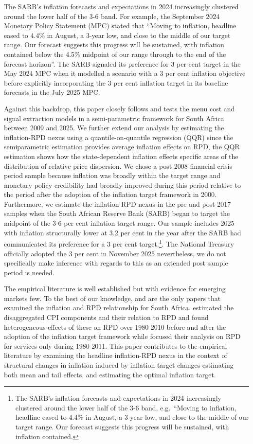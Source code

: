 \documentclass[
  letterpaper,
  DIV=11,
  numbers=noendperiod]{scrartcl}
\begin{document}
The SARB's inflation forecasts and expectations in 2024 increasingly
clustered around the lower half of the 3-6 band. For example, the
September 2024 Monetary Policy Statement (MPC) stated that ``Moving to
inflation, headline eased to 4.4\% in August, a 3-year low, and close to
the middle of our target range. Our forecast suggests this progress will
be sustained, with inflation contained below the 4.5\% midpoint of our
range through to the end of the forecast horizon''. The SARB signaled
its preference for 3 per cent target in the May 2024 MPC when it
modelled a scenario with a 3 per cent inflation objective before
explicitly incorporating the 3 per cent inflation target in its baseline
forecasts in the July 2025 MPC.

Against this backdrop, this paper closely follows \citet{caraballo2013}
and tests the menu cost and signal extraction models in a
semi-parametric framework \citep{robinson1988a} for South Africa between
2009 and 2025. We further extend our analysis by estimating the
inflation-RPD nexus using a quantile-on-quantile regression (QQR) since
the semiparametric estimation provides average inflation effects on RPD,
the QQR estimation shows how the state-dependent inflation effects
specific areas of the distribution of relative price dispersion. We
chose a post 2008 financial crisis period sample because inflation was
broadly within the target range and monetary policy credibility had
broadly improved during this period relative to the period after the
adoption of the inflation target framework in 2000. Furthermore, we
estimate the inflation-RPD nexus in the pre-and post-2017 samples when
the South African Reserve Bank (SARB) began to target the midpoint of
the 3-6 per cent inflation target range. Our sample includes 2025 with
inflation structurally lower at 3.2 per cent in the year after the SARB
had communicated its preference for a 3 per cent target.\footnote{The
  SARB's inflation forecasts and expectations in 2024 increasingly
  clustered around the lower half of the 3-6 band, e.g.~``Moving to
  inflation, headline eased to 4.4\% in August, a 3-year low, and close
  to the middle of our target range. Our forecast suggests this progress
  will be sustained, with inflation contained.}. The National Treasury
officially adopted the 3 per cent in November 2025 nevertheless, we do
not specifically make inference with regards to this as an extended post
sample period is needed.

The empirical literature is well established but with evidence for
emerging markets few. To the best of our knowledge, \citet{ndou2014} and
\citet{ndou2017} are the only papers that examined the inflation and RPD
relationship for South Africa. \citet{ndou2014} estimated the
disaggregated CPI components and their relation to RPD and found
heterogeneous effects of these on RPD over 1980-2010 before and after
the adoption of the inflation target framework while \citet{ndou2017}
focused their analysis on RPD for services only during 1980-2011. This
paper contributes to the empirical literature by examining the headline
inflation-RPD nexus in the context of structural changes in inflation
induced by inflation target changes estimating both mean and tail
effects, and estimating the optimal inflation target.
\end{document}
